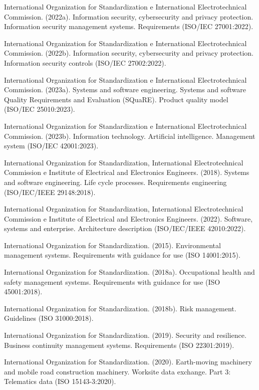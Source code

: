 \documentclass[formulario]{../../comun/overfore}
\begin{document}
\begin{referencias}
\item International Organization for Standardization e International Electrotechnical Commission. (2022a). Information security, cybersecurity and privacy protection. Information security management systems. Requirements (ISO/IEC 27001:2022).
\item International Organization for Standardization e International Electrotechnical Commission. (2022b). Information security, cybersecurity and privacy protection. Information security controls (ISO/IEC 27002:2022).
\item International Organization for Standardization e International Electrotechnical Commission. (2023a). Systems and software engineering. Systems and software Quality Requirements and Evaluation (SQuaRE). Product quality model (ISO/IEC 25010:2023).
\item International Organization for Standardization e International Electrotechnical Commission. (2023b). Information technology. Artificial intelligence. Management system (ISO/IEC 42001:2023).
\item International Organization for Standardization, International Electrotechnical Commission e Institute of Electrical and Electronics Engineers. (2018). Systems and software engineering. Life cycle processes. Requirements engineering (ISO/IEC/IEEE 29148:2018).
\item International Organization for Standardization, International Electrotechnical Commission e Institute of Electrical and Electronics Engineers. (2022). Software, systems and enterprise. Architecture description (ISO/IEC/IEEE 42010:2022).
\item International Organization for Standardization. (2015). Environmental management systems. Requirements with guidance for use (ISO 14001:2015).
\item International Organization for Standardization. (2018a). Occupational health and safety management systems. Requirements with guidance for use (ISO 45001:2018).
\item International Organization for Standardization. (2018b). Risk management. Guidelines (ISO 31000:2018).
\item International Organization for Standardization. (2019). Security and resilience. Business continuity management systems. Requirements (ISO 22301:2019).
\item International Organization for Standardization. (2020). Earth-moving machinery and mobile road construction machinery. Worksite data exchange. Part 3: Telematics data (ISO 15143-3:2020).

\end{referencias}
\end{document}
